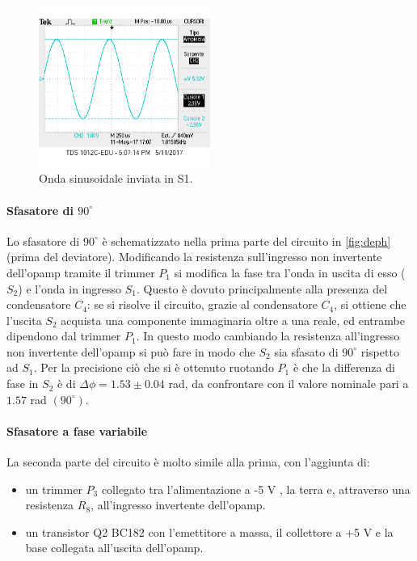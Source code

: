 \documentclass[a4paper,10pt]{article}
\begin{document}
\begin{figure}[H]
	\centering
	\includegraphics[width=0.5\textwidth]{../grafici/s1.png}
	\caption{Onda sinusoidale inviata in S1.}
	\label{fig:s1}
\end{figure}

\paragraph{Sfasatore di $90^\circ$} 

Lo sfasatore di $90^\circ$ è schematizzato nella prima parte del circuito in \cref{fig:deph} (prima del deviatore). \newline
Modificando la resistenza sull'ingresso non invertente dell'opamp tramite il trimmer $P_1$ si modifica la fase tra l'onda in uscita di esso ($S_2$) e l'onda in ingresso $S_1$. Questo è dovuto principalmente alla presenza del
condensatore $C_4$: se si risolve il circuito, grazie al condensatore $C_4$, si ottiene che l'uscita $S_2$ acquista una componente immaginaria oltre a una reale, ed entrambe dipendono dal trimmer $P_1$. In questo modo cambiando la resistenza all'ingresso non invertente dell'opamp si può fare in modo che $S_2$ sia sfasato di $90^\circ$ rispetto ad $S_1$. Per la precisione ciò che si è ottenuto ruotando $P_1$ è che la differenza di fase in $S_2$ è di $\Delta \phi = 1.53\pm0.04$ rad, da confrontare con il valore nominale pari a $1.57$ rad $(90^\circ)$.

\paragraph{Sfasatore a fase variabile}

La seconda parte del circuito è molto simile alla prima, con l'aggiunta di:
\begin{itemize}

\item un trimmer $P_3$ collegato tra l'alimentazione a -5 V , la terra e, attraverso una resistenza $R_8$, all'ingresso invertente dell'opamp.

\item un transistor Q2 BC182 con l'emettitore a massa, il collettore a +5 V e la base collegata all'uscita dell'opamp.
\end{itemize}
\end{document}
